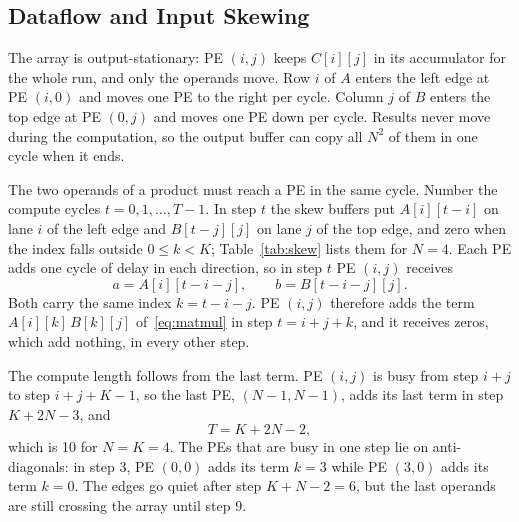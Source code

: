 
\subsection{Dataflow and Input Skewing}
The array is output-stationary: PE $(i,j)$ keeps $C[i][j]$ in its accumulator for the whole run, and only the operands move. Row $i$ of $A$ enters the left edge at PE $(i,0)$ and moves one PE to the right per cycle. Column $j$ of $B$ enters the top edge at PE $(0,j)$ and moves one PE down per cycle. Results never move during the computation, so the output buffer can copy all $N^2$ of them in one cycle when it ends.

The two operands of a product must reach a PE in the same cycle. Number the compute cycles $t = 0, 1, \ldots, T-1$. In step $t$ the skew buffers put $A[i][t-i]$ on lane $i$ of the left edge and $B[t-j][j]$ on lane $j$ of the top edge, and zero when the index falls outside $0 \le k < K$; Table~\ref{tab:skew} lists them for $N = 4$. Each PE adds one cycle of delay in each direction, so in step $t$ PE $(i,j)$ receives
\begin{equation}
a = A[i][t-i-j], \qquad b = B[t-i-j][j].
\end{equation}
Both carry the same index $k = t - i - j$. PE $(i,j)$ therefore adds the term $A[i][k]\,B[k][j]$ of~\eqref{eq:matmul} in step $t = i + j + k$, and it receives zeros, which add nothing, in every other step.

The compute length follows from the last term. PE $(i,j)$ is busy from step $i+j$ to step $i+j+K-1$, so the last PE, $(N{-}1,N{-}1)$, adds its last term in step $K + 2N - 3$, and
\begin{equation}
T = K + 2N - 2,
\end{equation}
which is 10 for $N = K = 4$. The PEs that are busy in one step lie on anti-diagonals: in step 3, PE $(0,0)$ adds its term $k = 3$ while PE $(3,0)$ adds its term $k = 0$. The edges go quiet after step $K + N - 2 = 6$, but the last operands are still crossing the array until step 9.

